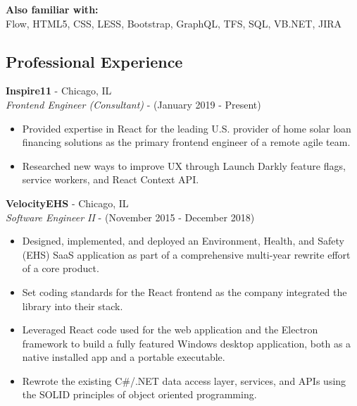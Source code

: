 \documentclass[12pt]{article}
\begin{document}
\begin{paracol}{2}
\noindent \textbf{Also familiar with:}\\
Flow, HTML5, CSS, LESS, Bootstrap, GraphQL, TFS, SQL, VB.NET, JIRA

\switchcolumn 

\subsection*{Professional Experience} 

\textbf{Inspire11} - Chicago, IL \\
\textit{Frontend Engineer (Consultant)} - {\footnotesize{(January 2019 - Present)}} 
\begin{itemize}
    \setlength\itemsep{0.1em}
    \item{\footnotesize{Provided expertise in React for the leading U.S. provider of home solar loan financing solutions as the primary frontend engineer of a remote agile team.}}
    \item {\footnotesize{Researched new ways to improve UX through Launch Darkly feature flags, service workers, and React Context API.}}
\end{itemize} 

\noindent \textbf{VelocityEHS} - Chicago, IL \\
\textit{Software Engineer II} - {\footnotesize{(November 2015 - December 2018)}}
\begin{itemize}
    \setlength\itemsep{0.1em}
    \item {\footnotesize{Designed, implemented, and deployed an Environment, Health, and Safety (EHS) SaaS application as part of a comprehensive multi-year rewrite effort of a core product.}}
    \item {\footnotesize{Set coding standards for the React frontend as the company integrated the library into their stack.}}
    \item {\footnotesize{Leveraged React code used for the web application and the Electron framework to build a fully featured Windows desktop application, both as a native installed app and a portable executable.}}
    \item {\footnotesize{Rewrote the existing C\#/.NET data access layer, services, and APIs using the SOLID principles of object oriented programming.}}
\end{itemize} 


\end{paracol}
\end{document}
